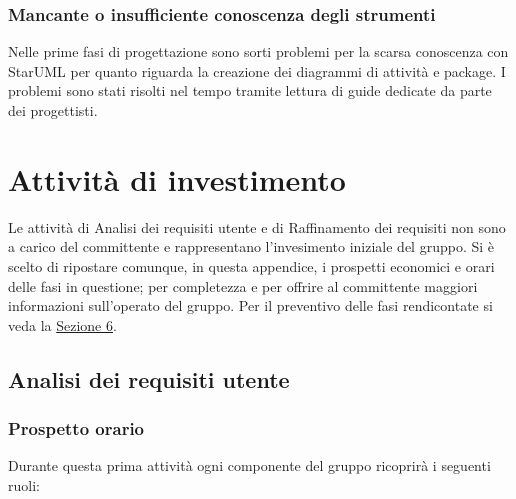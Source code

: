 \documentclass[a4paper, titlepage]{article}
\begin{document}
	\subsubsection{Mancante o insufficiente conoscenza degli strumenti}
	Nelle prime fasi di progettazione sono sorti problemi per la scarsa conoscenza con StarUML per quanto riguarda la creazione dei diagrammi di attività e package. I problemi sono stati risolti nel tempo tramite lettura di guide dedicate da parte dei progettisti.
	
	
	\newpage
	\section{Attività di investimento} \label{Investimento}
	Le attività di Analisi dei requisiti utente e di Raffinamento dei requisiti non sono a carico del committente e rappresentano l'invesimento iniziale del gruppo. Si è scelto di ripostare comunque, in questa appendice, i prospetti economici e orari delle fasi in questione; per completezza e per offrire al committente maggiori informazioni sull'operato del gruppo. Per il preventivo delle fasi rendicontate si veda la \hyperref[Preventivo] {Sezione 6}.
	
	
	\subsection{Analisi dei requisiti utente}
	\subsubsection{Prospetto orario}
	Durante questa prima attività ogni componente del gruppo ricoprirà i seguenti ruoli:
	
\end{document}
